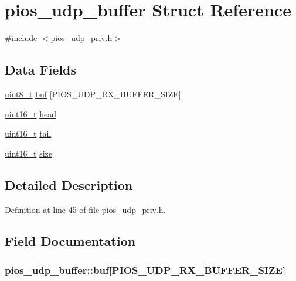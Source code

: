 \hypertarget{structpios__udp__buffer}{\section{pios\-\_\-udp\-\_\-buffer Struct Reference}
\label{structpios__udp__buffer}
}


{\ttfamily \#include $<$pios\-\_\-udp\-\_\-priv.\-h$>$}

\subsection*{Data Fields}
\begin{DoxyCompactItemize}
\item 
\hyperlink{stdint_8h_aba7bc1797add20fe3efdf37ced1182c5}{uint8\-\_\-t} \hyperlink{structpios__udp__buffer_aa609c26803633bd53f3c9c80056d21ab}{buf} \mbox{[}P\-I\-O\-S\-\_\-\-U\-D\-P\-\_\-\-R\-X\-\_\-\-B\-U\-F\-F\-E\-R\-\_\-\-S\-I\-Z\-E\mbox{]}
\item 
\hyperlink{stdint_8h_a273cf69d639a59973b6019625df33e30}{uint16\-\_\-t} \hyperlink{structpios__udp__buffer_af175b1e49aa32af8c38933a3c7e32d01}{head}
\item 
\hyperlink{stdint_8h_a273cf69d639a59973b6019625df33e30}{uint16\-\_\-t} \hyperlink{structpios__udp__buffer_aea5cd8277c4484fb41c81df68139c47d}{tail}
\item 
\hyperlink{stdint_8h_a273cf69d639a59973b6019625df33e30}{uint16\-\_\-t} \hyperlink{structpios__udp__buffer_addcfd72bb66d1ca1dae652fc36cecd12}{size}
\end{DoxyCompactItemize}


\subsection{Detailed Description}


Definition at line 45 of file pios\-\_\-udp\-\_\-priv.\-h.



\subsection{Field Documentation}
\hypertarget{structpios__udp__buffer_aa609c26803633bd53f3c9c80056d21ab}{
\subsubsection[{buf}]{ pios\-\_\-udp\-\_\-buffer\-::buf\mbox{[}P\-I\-O\-S\-\_\-\-U\-D\-P\-\_\-\-R\-X\-\_\-\-B\-U\-F\-F\-E\-R\-\_\-\-S\-I\-Z\-E\mbox{]}}}\label{structpios__udp__buffer_aa609c26803633bd53f3c9c80056d21ab}


